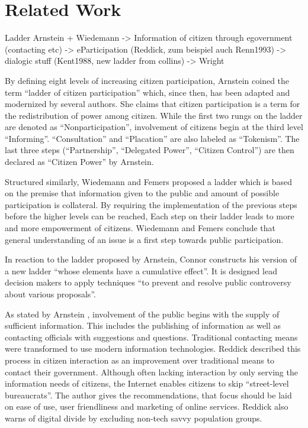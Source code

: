 \section{Related Work}

Ladder Arnstein + Wiedemann -> Information of citizen through egovernment (contacting etc) -> eParticipation (Reddick, zum beispiel auch Renn1993) -> dialogic stuff (Kent1988, new ladder from collins) -> Wright


\label{chap:related_work}
By defining eight levels of increasing citizen participation, Arnstein \cite{Arnstein1969_citizen_participation} coined the term ``ladder of citizen participation'' which, since then, has been adapted and modernized \cite{Connor1988_new_ladder,carver2003future,Collins2009_social_learning,you2009_participatory_map_based,Cai2009_spatial_annotation_deliberation} by several authors. She claims that citizen participation is a term for the redistribution of power among citizen. While the first two rungs on the ladder are denoted as ``Nonparticipation'', involvement of citizens begin at the third level ``Informing''. ``Consultation'' and ``Placation'' are also labeled as ``Tokenism''. The last three steps (``Partnership'', ``Delegated Power'', ``Citizen Control'') are then declared as ``Citizen Power'' by Arnstein.

Structured similarly, Wiedemann and Femers \cite{Wiedemann1993355} proposed a ladder which is based on the premise that information given to the public and amount of possible participation is collateral. By requiring the implementation of the previous steps before the higher levels can be reached, Each step on their ladder leads to more and more empowerment of citizens. Wiedemann and Femers conclude that general understanding of an issue is a first step towards public participation.

In reaction to the ladder proposed by Arnstein, Connor \cite{Connor1988_new_ladder} constructs his version of a new ladder ``whose elements have a cumulative effect''. It is designed lead decision makers to apply techniques ``to prevent and resolve public controversy about various proposals''. 

As stated by Arnstein \cite{Arnstein1969_citizen_participation}, involvement of the public begins with the supply of sufficient information.  This includes the publishing of information as well as contacting officials with suggestions and questions. Traditional contacting means were transformed to use modern information technologies. Reddick \cite{Reddick2005_Citizen_interaction_with_egovernment} described this process in citizen interaction as an improvement over traditional means to contact their government. Although often lacking interaction by only serving the information needs of citizens, the Internet enables citizens to skip ``street-level bureaucrats''. The author gives the recommendations, that focus should be laid on ease of use, user friendliness and marketing of online services. Reddick also warns of digital divide by excluding non-tech savvy population groups.


